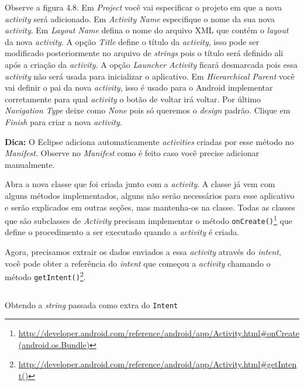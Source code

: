 \documentclass[a4paper,12pt,brazil]{book}
\begin{document}
\begin{singlespace}
Observe a figura 4.8. Em \emph{Project} você vai especificar o projeto em que a nova \emph{activity} será adicionado. Em \emph{Activity Name} especifique o nome da sua nova \emph{activity}. Em \emph{Layout Name} defina o nome do arquivo XML que contém o \emph{layout} da nova \emph{activity}. A opção \emph{Title} define o título da \emph{activity}, isso pode ser modificado posteriormente no arquivo de \emph{strings} pois o título será definido ali após a criação da \emph{activity}. A opção \emph{Launcher Activity} ficará desmarcada pois essa \emph{activity} não será usada para inicializar o aplicativo. Em \emph{Hierarchical Parent} você vai definir o pai da nova \emph{activity}, isso é usado para o Android implementar corretamente para qual \emph{activity} o botão de voltar irá voltar. Por último \emph{Navigation Type} deixe como \emph{None} pois só queremos o \emph{design} padrão. Clique em \emph{Finish} para criar a nova \emph{activity}.
 
\begin{framed}
\textbf{Dica:} O Eclipse adiciona automaticamente \emph{activities} criadas por esse método no \emph{Manifest}. Observe no \emph{Manifest} como é feito caso você precise adicionar manualmente.
\end{framed}


Abra a nova classe que foi criada junto com a \emph{activity}. A classe já vem com alguns métodos implementados, alguns não serão necessários para esse aplicativo e serão explicados em outras seções, mas mantenha-os na classe. Todas as classes que são subclasses de \emph{Activity} precisam implementar o método \texttt{onCreate()}\footnote{\href{http://developer.android.com/reference/android/app/Activity.html\#onCreate(android.os.Bundle)}{http://developer.android.com/reference/android/app/Activity.html\#onCreate(android.os.Bundle)}} que define o procedimento a ser executado quando a \emph{activity} é criada.

Agora, precisamos extrair os dados enviados a essa \emph{activity} através do \emph{intent}, você pode obter a referência do \emph{intent} que começou a \emph{activity} chamando o método \texttt{getIntent()}\footnote{\href{http://developer.android.com/reference/android/app/Activity.html\#getIntent()}{http://developer.android.com/reference/android/app/Activity.html\#getIntent()}}.

\begin{listing}[H]
\inputminted[linenos=true,fontsize=\small,frame=lines, framesep=2mm, tabsize=2,numbersep=5pt]{java}{src/firstapp/8.java}
\caption{Obtendo a \emph{string} passada como extra do \texttt{Intent}}
\label{code:obtendo-string-intent}
\end{listing}


\end{singlespace}
\end{document}
